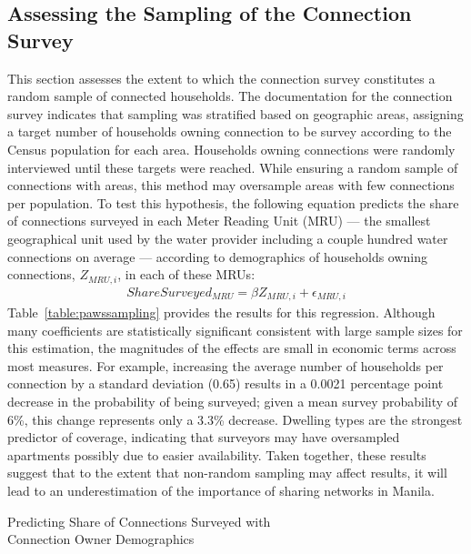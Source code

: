 \documentclass[12pt]{article}
\begin{document}
\begin{appendices}
\section{Assessing the Sampling of the Connection Survey}\label{appendix:pawssampling}

This section assesses the extent to which the connection survey constitutes a random sample of connected households.  The documentation for the connection survey indicates that sampling was stratified based on geographic areas, assigning a target number of households owning connection to be survey according to the Census population for each area.  Households owning connections were randomly interviewed until these targets were reached.  While ensuring a random sample of connections with areas, this method may oversample areas with few connections per population.  To test this hypothesis, the following equation predicts the share of connections surveyed in each Meter Reading Unit (MRU) --- the smallest geographical unit used by the water provider including a couple hundred water connections on average --- according to demographics of households owning connections, $Z_{MRU,i}$, in each of these MRUs:
\begin{align*}
ShareSurveyed_{MRU} = \beta Z_{MRU,i} + \epsilon_{MRU,i}
\end{align*}
Table~\ref{table:pawssampling} provides the results for this regression.  Although many coefficients are statistically significant consistent with large sample sizes for this estimation, the magnitudes of the effects are small in economic terms across most measures.  For example, increasing the average number of households per connection by a standard deviation (0.65) results in a 0.0021 percentage point decrease in the probability of being surveyed; given a mean survey probability of 6\%, this change represents only a 3.3\% decrease.  Dwelling types are the strongest predictor of coverage, indicating that surveyors may have oversampled apartments possibly due to easier availability.  Taken together, these results suggest that to the extent that non-random sampling may affect results, it will lead to an underestimation of the importance of sharing networks in Manila.

\begin{table}
\centering
\caption{ Predicting Share of Connections Surveyed with \\ Connection Owner Demographics }\label{table:pawssampling}

\end{table}





\end{appendices}
\end{document}
